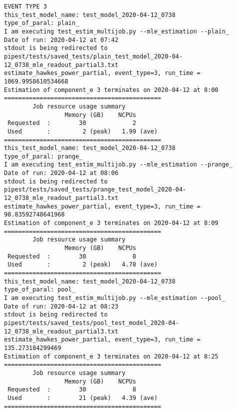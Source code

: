  \begin{Verbatim}[commandchars=\\\{\}, fontsize=\small]
EVENT TYPE 3
this_test_model_name: test_model_2020-04-12_0738
type_of_paral: plain_
I am executing test_estim_multijob.py --mle_estimation --plain_
Date of run: 2020-04-12 at 07:42
stdout is being redirected to pipest/tests/saved_tests/plain_test_model_2020-04-12_0738_mle_readout_partial3.txt
estimate_hawkes_power_partial, event_type=3, run_time = 1069.9958610534668
Estimation of component_e 3 terminates on 2020-04-12 at 8:00
============================================
        Job resource usage summary 
                 Memory (GB)    NCPUs
 Requested  :        30             2
 Used       :         2 (peak)   1.99 (ave)
============================================
this_test_model_name: test_model_2020-04-12_0738
type_of_paral: prange_
I am executing test_estim_multijob.py --mle_estimation --prange_
Date of run: 2020-04-12 at 08:06
stdout is being redirected to pipest/tests/saved_tests/prange_test_model_2020-04-12_0738_mle_readout_partial3.txt
estimate_hawkes_power_partial, event_type=3, run_time = 98.83592748641968
Estimation of component_e 3 terminates on 2020-04-12 at 8:09
============================================
        Job resource usage summary 
                 Memory (GB)    NCPUs
 Requested  :        30             8
 Used       :         2 (peak)   4.78 (ave)
============================================
this_test_model_name: test_model_2020-04-12_0738
type_of_paral: pool_
I am executing test_estim_multijob.py --mle_estimation --pool_
Date of run: 2020-04-12 at 08:23
stdout is being redirected to pipest/tests/saved_tests/pool_test_model_2020-04-12_0738_mle_readout_partial3.txt
estimate_hawkes_power_partial, event_type=3, run_time = 135.273184299469
Estimation of component_e 3 terminates on 2020-04-12 at 8:25
============================================
        Job resource usage summary 
                 Memory (GB)    NCPUs
 Requested  :        30             8
 Used       :        21 (peak)   4.39 (ave)
============================================
 \end{Verbatim}
